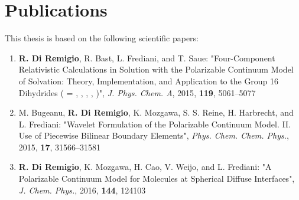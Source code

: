 \thispagestyle{empty}
\chapter*{Publications}%

This thesis is based on the following scientific papers:

\begin{enumerate}[label=\textbf{\Roman{*} },ref=\Roman{*}]

\item
  \textbf{R. Di Remigio}, R. Bast, L. Frediani, and T. Saue:
  "Four-Component Relativistic Calculations in Solution with the
  Polarizable Continuum Model of Solvation: Theory,
  Implementation, and Application to the Group 16 Dihydrides
   ( = , , , ,
  )",
\textit{J. Phys. Chem. A}, \textrm{2015}, \textbf{119}, 5061--5077
\label{relapcm}

\item
  M. Bugeanu, \textbf{R. Di Remigio}, K. Mozgawa, S. S. Reine, H.
  Harbrecht,  and L. Frediani:
  "Wavelet Formulation of the Polarizable Continuum Model. II. Use of
  Piecewise Bilinear Boundary Elements",
  \textit{Phys. Chem. Chem. Phys.}, \textrm{2015}, \textbf{17},
  31566--31581
\label{wemlin}

\item
  \textbf{R. Di Remigio}, K. Mozgawa, H. Cao, V. Weijo, and L.
  Frediani:
  "A Polarizable Continuum Model for Molecules at Spherical
  Diffuse Interfaces",
  \textit{J. Chem. Phys.}, \textrm{2016}, \textbf{144}, 124103
\label{spherical}

\end{enumerate}
